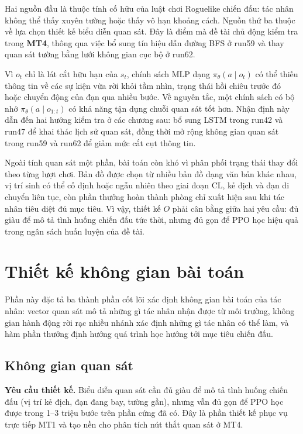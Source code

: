 Hai nguồn đầu là thuộc tính cố hữu của luật chơi Roguelike chiến đấu: tác nhân không thể thấy xuyên tường hoặc thấy vô hạn khoảng cách. Nguồn thứ ba thuộc về lựa chọn thiết kế biểu diễn quan sát. Đây là điểm mà đề tài chủ động kiểm tra trong \textbf{MT4}, thông qua việc bổ sung tín hiệu dẫn đường BFS ở run59 và thay quan sát tường bằng lưới không gian cục bộ ở run62.

Vì $o_t$ chỉ là lát cắt hữu hạn của $s_t$, chính sách MLP dạng $\pi_\theta(a \mid o_t)$ có thể thiếu thông tin về các sự kiện vừa rời khỏi tầm nhìn, trạng thái hồi chiêu trước đó hoặc chuyển động của đạn qua nhiều bước. Về nguyên tắc, một chính sách có bộ nhớ $\pi_\theta(a \mid o_{1:t})$ có khả năng tận dụng chuỗi quan sát tốt hơn. Nhận định này dẫn đến hai hướng kiểm tra ở các chương sau: bổ sung LSTM trong run42 và run47 để khai thác lịch sử quan sát, đồng thời mở rộng không gian quan sát trong run59 và run62 để giảm mức cắt cụt thông tin.

Ngoài tính quan sát một phần, bài toán còn khó vì phân phối trạng thái thay đổi theo từng lượt chơi. Bản đồ được chọn từ nhiều bản đồ dạng văn bản khác nhau, vị trí sinh có thể cố định hoặc ngẫu nhiên theo giai đoạn CL, kẻ địch và đạn di chuyển liên tục, còn phần thưởng hoàn thành phòng chỉ xuất hiện sau khi tác nhân tiêu diệt đủ mục tiêu. Vì vậy, thiết kế $O$ phải cân bằng giữa hai yêu cầu: đủ giàu để mô tả tình huống chiến đấu tức thời, nhưng đủ gọn để PPO học hiệu quả trong ngân sách huấn luyện của đề tài.

\section{Thiết kế không gian bài toán}

Phần này đặc tả ba thành phần cốt lõi xác định không gian bài toán của tác nhân: vector quan sát mô tả những gì tác nhân nhận được từ môi trường, không gian hành động rời rạc nhiều nhánh xác định những gì tác nhân có thể làm, và hàm phần thưởng định hướng quá trình học hướng tới mục tiêu chiến đấu.

\subsection{Không gian quan sát}

\textbf{Yêu cầu thiết kế.} Biểu diễn quan sát cần đủ giàu để mô tả tình huống chiến đấu (vị trí kẻ địch, đạn đang bay, tường gần), nhưng vẫn đủ gọn để PPO học được trong 1--3 triệu bước trên phần cứng đã có. Đây là phần thiết kế phục vụ trực tiếp MT1 và tạo nền cho phân tích nút thắt quan sát ở MT4.

